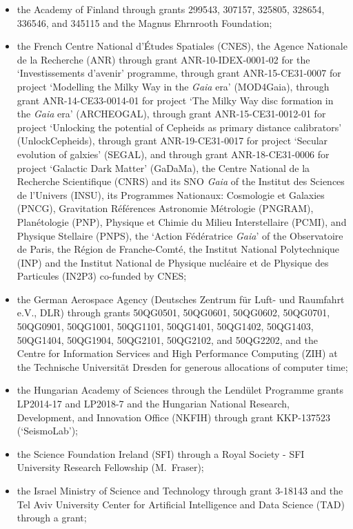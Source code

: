 \documentclass[longauth]{aa}
\newcommand\gaia{\textit{Gaia}\xspace}
\begin{document}
\begin{appendix}
\begin{itemize}
\item the Academy of Finland through grants 299543, 307157, 325805, 328654, 336546, and 345115 and the Magnus Ehrnrooth Foundation;
\item the French Centre National d’\'{E}tudes Spatiales (CNES), the Agence Nationale de la Recherche (ANR) through grant ANR-10-IDEX-0001-02 for the `Investissements d'avenir' programme, through grant ANR-15-CE31-0007 for project `Modelling the Milky Way in the \gaia era’ (MOD4Gaia), through grant ANR-14-CE33-0014-01 for project `The Milky Way disc formation in the \gaia era’ (ARCHEOGAL), through grant ANR-15-CE31-0012-01 for project `Unlocking the potential of Cepheids as primary distance calibrators’ (UnlockCepheids), through grant ANR-19-CE31-0017 for project `Secular evolution of galxies' (SEGAL), and through grant ANR-18-CE31-0006 for project `Galactic Dark Matter' (GaDaMa), the Centre National de la Recherche Scientifique (CNRS) and its SNO \gaia of the Institut des Sciences de l’Univers (INSU), its Programmes Nationaux: Cosmologie et Galaxies (PNCG), Gravitation R\'{e}f\'{e}rences Astronomie M\'{e}trologie (PNGRAM), Plan\'{e}tologie (PNP), Physique et Chimie du Milieu Interstellaire (PCMI), and Physique Stellaire (PNPS), the `Action F\'{e}d\'{e}ratrice \gaia' of the Observatoire de Paris, the R\'{e}gion de Franche-Comt\'{e}, the Institut National Polytechnique (INP) and the Institut National de Physique nucl\'{e}aire et de Physique des Particules (IN2P3) co-funded by CNES;
\item the German Aerospace Agency (Deutsches Zentrum f\"{u}r Luft- und Raumfahrt e.V., DLR) through grants 50QG0501, 50QG0601, 50QG0602, 50QG0701, 50QG0901, 50QG1001, 50QG1101, 50\-QG1401, 50QG1402, 50QG1403, 50QG1404, 50QG1904, 50QG2101, 50QG2102, and 50QG2202, and the Centre for Information Services and High Performance Computing (ZIH) at the Technische Universit\"{a}t Dresden for generous allocations of computer time;
\item the Hungarian Academy of Sciences through the Lend\"{u}let Programme grants LP2014-17 and LP2018-7 and the Hungarian National Research, Development, and Innovation Office (NKFIH) through grant KKP-137523 (`SeismoLab');
\item the Science Foundation Ireland (SFI) through a Royal Society - SFI University Research Fellowship (M.~Fraser);
\item the Israel Ministry of Science and Technology through grant 3-18143 and the Tel Aviv University Center for Artificial Intelligence and Data Science (TAD) through a grant;

\end{itemize}
\end{appendix}
\end{document}
